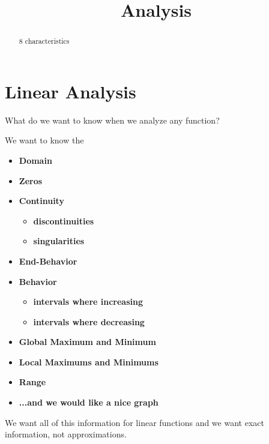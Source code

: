 \documentclass{ximera}
\title{Analysis}
\begin{document}
\begin{abstract}
8 characteristics
\end{abstract}
\maketitle





\section*{Linear Analysis}

What do we want to know when we analyze any function?

We want to know the 
\begin{itemize}
     \item \textbf{\textcolor{red!80!black}{Domain}} 
     \item \textbf{\textcolor{red!80!black}{Zeros}} 
     \item \textbf{\textcolor{red!80!black}{Continuity}} 
\begin{itemize}
     \item \textbf{\textcolor{red!80!black}{discontinuities}} 
     \item \textbf{\textcolor{red!80!black}{singularities}} 
\end{itemize}
     \item \textbf{\textcolor{red!80!black}{End-Behavior}} 
     \item \textbf{\textcolor{red!80!black}{Behavior}} 
\begin{itemize}
     \item \textbf{\textcolor{red!80!black}{intervals where increasing}} 
     \item \textbf{\textcolor{red!80!black}{intervals where decreasing}} 
\end{itemize}
     \item \textbf{\textcolor{red!80!black}{Global Maximum and Minimum}} 
     \item \textbf{\textcolor{red!80!black}{Local Maximums and Minimums}} 
     \item \textbf{\textcolor{red!80!black}{Range}} 
     \item \textbf{\textcolor{blue!55!black}{...and we would like a nice graph}} 
\end{itemize}

We want all of this information for linear functions and we want exact information, not approximations. \\
\end{document}
